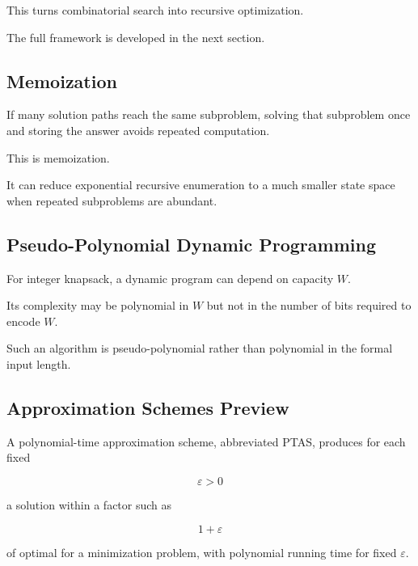 This turns combinatorial search into recursive optimization.

The full framework is developed in the next section.

\subsection{Memoization}
\label{subsec:combinatorial-memoization}

If many solution paths reach the same subproblem, solving that subproblem
once and storing the answer avoids repeated computation.

This is memoization.

It can reduce exponential recursive enumeration to a much smaller state
space when repeated subproblems are abundant.

\subsection{Pseudo-Polynomial Dynamic Programming}
\label{subsec:combinatorial-pseudo-polynomial}

For integer knapsack, a dynamic program can depend on capacity \(W\).

Its complexity may be polynomial in \(W\) but not in the number of bits
required to encode \(W\).

Such an algorithm is pseudo-polynomial rather than polynomial in the
formal input length.

\subsection{Approximation Schemes Preview}
\label{subsec:approximation-schemes-preview}

A polynomial-time approximation scheme, abbreviated PTAS, produces for
each fixed

\[
\varepsilon>0
\]

a solution within a factor such as

\[
\boxed{
1+\varepsilon
}
\]

of optimal for a minimization problem, with polynomial running time for
fixed \(\varepsilon\).

